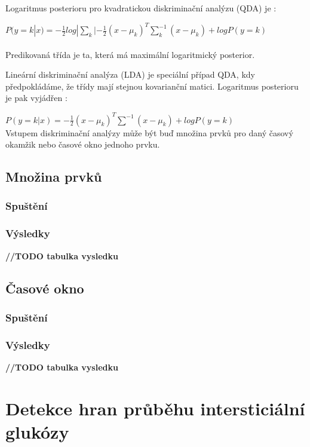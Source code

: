 Logaritmus posterioru pro kvadratickou diskriminační analýzu (QDA) je \citep{cho.book.lda}:

$P(y=k|x)=-\frac{1}{2}log|\sum_{k}|-\frac{1}{2}(x-\mu_{k})^{T}\sum^{-1}_{k}(x-\mu_{k})+logP(y=k)$\\\\
Predikovaná třída je ta, která má maximální logaritmický posterior.

Lineární diskriminační analýza (LDA) je speciální případ QDA, kdy předpokládáme, že třídy mají stejnou kovarianční matici.  Logaritmus posterioru je pak vyjádřen \citep{cho.scikit.lda}:

$P(y=k|x)=-\frac{1}{2}(x-\mu_{k})^{T}\sum^{-1}(x-\mu_{k})+logP(y=k)$\\

Vstupem diskriminační analýzy může být buď množina prvků pro daný časový okamžik nebo časové okno jednoho prvku.

\subsection{Množina prvků}

\subsubsection{Spuštění}

\subsubsection{Výsledky}

\textbf{//TODO tabulka vysledku}

\subsection{Časové okno}

\subsubsection{Spuštění}

\subsubsection{Výsledky}

\textbf{//TODO tabulka vysledku}


\section{Detekce hran průběhu intersticiální glukózy}
\label{ch:threshold}

